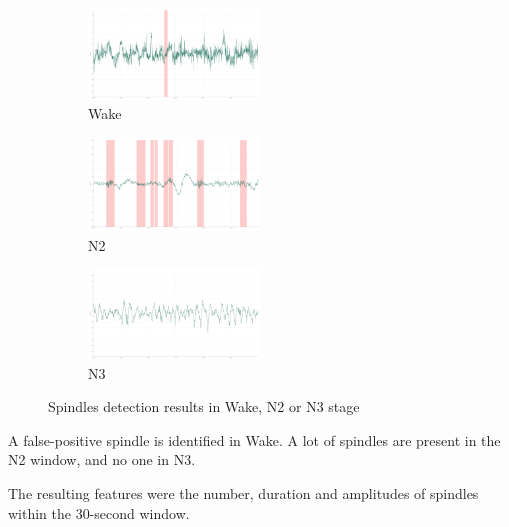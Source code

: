 \documentclass[12pt]{report}
\begin{document}
\begin{figure}[H]
\begin{subfigure}{1.\textwidth}
	\centering
	\includegraphics[width=0.5\textwidth]{img/chap2/wake_ssb.png}
	\caption{Wake}
	\label{fig:wake_window_ss}
\end{subfigure}

\begin{subfigure}{1.\textwidth}
	\centering
	\includegraphics[width=0.5\textwidth]{img/chap2/n2_ssb.png}
	\caption{N2}
	\label{fig:n2_window_ss}
\end{subfigure}

\begin{subfigure}{1.\textwidth}
	\centering
  	\includegraphics[width=0.5\textwidth]{img/chap2/n3_ssb.png}
	\caption{N3}
	\label{fig:n3_window_ss}
\end{subfigure}

\caption{\label{fig:3windows_ss}Spindles detection results in Wake, N2 or N3 stage}
\end{figure}

A false-positive spindle is identified in Wake. A lot of spindles are present in the N2 window, and no one in N3.

The resulting features were the number, duration and amplitudes of spindles within the 30-second window.

\vspace{5mm}
\end{document}
